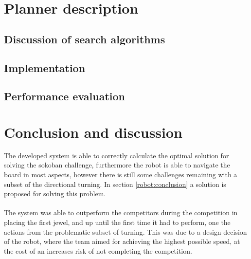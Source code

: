 \documentclass[final, english, a4paper]{article}
\begin{document}
\section{Planner description}
    
	\subsection{Discussion of search algorithms} %
		
	\subsection{Implementation}
	
	\subsection{Performance evaluation}
	
\section{Conclusion and discussion}    
    The developed system is able to correctly calculate the optimal solution for solving
    the sokoban challenge, furthermore the robot is able to navigate the board in most
    aspects, however there is still some challenges remaining with a subset of the directional turning.
    In section \ref{robot:conclusion} a solution is proposed for solving this problem.\\
    \\
    The system was able to outperform the competitors during the competition in
    placing the first jewel, and up until the first time it had to perform,
    one the actions from the problematic subset of turning.
    This was due to a design decision of the robot, where the team aimed for 
    achieving the highest possible speed, at the cost of an increases risk of
    not completing the competition.
    \\\\


\appendix
\end{document}

